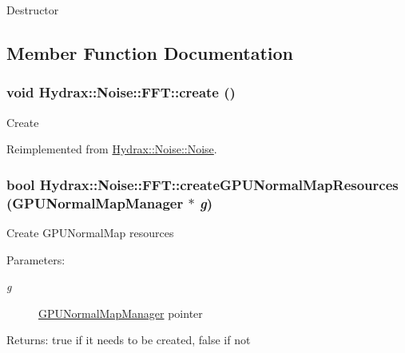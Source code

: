 Destructor 

\subsection{Member Function Documentation}
\hypertarget{class_hydrax_1_1_noise_1_1_f_f_t_c382e8624b864a32267687592b769bd3}{
\subsubsection[{create}]{\setlength{\rightskip}{0pt plus 5cm}void Hydrax::Noise::FFT::create ()}}
\label{class_hydrax_1_1_noise_1_1_f_f_t_c382e8624b864a32267687592b769bd3}


Create 

Reimplemented from \hyperlink{class_hydrax_1_1_noise_1_1_noise_be9cf8765feed765e6a35b0779125f6a}{Hydrax::Noise::Noise}.\hypertarget{class_hydrax_1_1_noise_1_1_f_f_t_a8e2b9d2b8307c07be2d2cd9cf115560}{
\subsubsection[{createGPUNormalMapResources}]{\setlength{\rightskip}{0pt plus 5cm}bool Hydrax::Noise::FFT::createGPUNormalMapResources ({\bf GPUNormalMapManager} $\ast$ {\em g})}}
\label{class_hydrax_1_1_noise_1_1_f_f_t_a8e2b9d2b8307c07be2d2cd9cf115560}


Create GPUNormalMap resources \begin{Desc}
\item[Parameters:]
\begin{description}
\item[{\em g}]\hyperlink{class_hydrax_1_1_g_p_u_normal_map_manager}{GPUNormalMapManager} pointer \end{description}
\end{Desc}
\begin{Desc}
\item[Returns:]true if it needs to be created, false if not \end{Desc}


